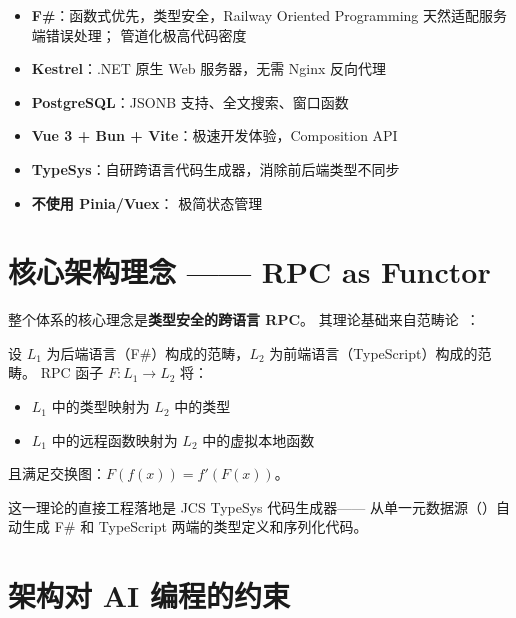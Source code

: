 \documentclass[10pt, openany]{book}
\begin{document}
\begin{itemize}
    \item \textbf{F\#}：函数式优先，类型安全，Railway Oriented Programming 天然适配服务端错误处理；\cmd{|>} 管道化极高代码密度~\cite{Syme2007FSharp}
    \item \textbf{Kestrel}：.NET 原生 Web 服务器，无需 Nginx 反向代理
    \item \textbf{PostgreSQL}：JSONB 支持、全文搜索、窗口函数
    \item \textbf{Vue 3 + Bun + Vite}：极速开发体验，Composition API
    \item \textbf{TypeSys}：自研跨语言代码生成器，消除前后端类型不同步
    \item \textbf{不使用 Pinia/Vuex}： 极简状态管理
\end{itemize}

\section{核心架构理念 —— RPC as Functor}

整个体系的核心理念是\textbf{类型安全的跨语言 RPC}。
其理论基础来自范畴论~\cite{Chen2024RPCFunctor,MacLane1971}：

\begin{definition}[RPC 函子]
设 \(L_1\) 为后端语言（F\#）构成的范畴，\(L_2\) 为前端语言（TypeScript）构成的范畴。
RPC 函子 \(F: L_1 \to L_2\) 将：
\begin{itemize}
    \item \(L_1\) 中的类型映射为 \(L_2\) 中的类型
    \item \(L_1\) 中的远程函数映射为 \(L_2\) 中的虚拟本地函数
\end{itemize}
且满足交换图：\(F(f(x)) = f'(F(x))\)。
\end{definition}

这一理论的直接工程落地是 JCS TypeSys 代码生成器——
从单一元数据源（）自动生成 F\# 和 TypeScript 两端的类型定义和序列化代码。

\section{架构对 AI 编程的约束}
\end{document}
